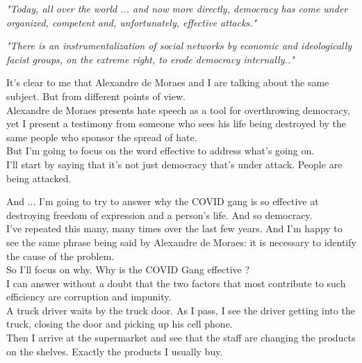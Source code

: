 \documentclass[11pt]{book}
\begin{document}
\noindent \begin{center} \emph{"Today, all over the world ... and now more directly, democracy has come under organized, competent and, unfortunately, effective attacks."} \end{center}

\noindent \begin{center} \emph{"There is an instrumentalization of social networks by economic and ideologically facist groups, on the extreme right, to erode democracy internally.."} \end{center}

\noindent It's clear to me that Alexandre de Moraes and I are talking about the same subject. But from different points of view. \\

\noindent Alexandre de Moraes presents hate speech as a tool for overthrowing democracy, yet I present a testimony from someone who sees his life being destroyed by the same people who sponsor the spread of hate. \\

\noindent But I'm going to focus on the word effective to address what's going on. \\

\noindent I'll start by saying that it's not just democracy that's under attack. People are being attacked. 

\noindent And ... I'm going to try to answer why the COVID gang is so effective at destroying freedom of expression and a person's life. And so democracy. \\

\noindent I've repeated this many, many times over the last few years. And I'm happy to see the same phrase being said by Alexandre de Moraes: it is necessary to identify the cause of the problem. \\

\noindent So I'll focus on why. Why is the COVID Gang effective ? \\

\noindent I can answer without a doubt that the two factors that most contribute to such efficiency are corruption and impunity. \\

\noindent A truck driver waits by the truck door. As I pass, I see the driver getting into the truck, closing the door and picking up his cell phone. \\

\noindent Then I arrive at the supermarket and see that the staff are changing the products on the shelves. Exactly the products I usually buy. \\
\end{document}
